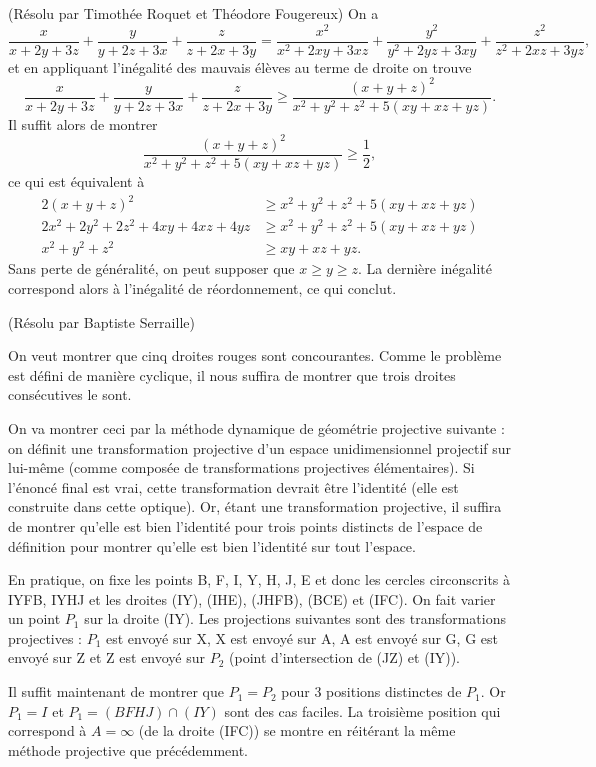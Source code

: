 \begin{sol}[83](R\'esolu par Timoth\'ee Roquet et Th\'eodore Fougereux)
On a
\[\frac{x}{x+2y+3z}+\frac{y}{y+2z+3x}+\frac{z}{z+2x+3y}=\frac{x^2}{x^2+2xy+3xz}+\frac{y^2}{y^2+2yz+3xy}+\frac{z^2}{z^2+2xz+3yz},\]
et en appliquant l'in\'egalit\'e des mauvais \'el\`eves au terme de droite on trouve
\[\frac{x}{x+2y+3z}+\frac{y}{y+2z+3x}+\frac{z}{z+2x+3y}\geq \frac{(x+y+z)^2}{x^2+y^2+z^2+5(xy+xz+yz)}.\]
Il suffit alors de montrer
\[\frac{(x+y+z)^2}{x^2+y^2+z^2+5(xy+xz+yz)}\geq \frac12,\]
ce qui est \'equivalent \`a
\begin{align*}
2(x+y+z)^2 &\geq x^2+y^2+z^2+5(xy+xz+yz)\\
2x^2+2y^2+2z^2+4xy+4xz+4yz &\geq x^2+y^2+z^2+5(xy+xz+yz)\\
x^2+y^2+z^2 &\geq xy+xz+yz.
\end{align*}
Sans perte de g\'en\'eralit\'e, on peut supposer que $x\geq y\geq z$. La derni\`ere in\'egalit\'e correspond alors \`a l'in\'egalit\'e de r\'eordonnement, ce qui conclut.

\end{sol}

\begin{sol}[97](Résolu par Baptiste Serraille)

On veut montrer que cinq droites rouges sont concourantes. Comme le problème est d\'efini de manière cyclique, il nous suffira de montrer que trois droites cons\'ecutives le sont. 

On va montrer ceci par la m\'ethode dynamique de g\'eom\'etrie projective suivante : 
on d\'efinit une transformation projective d'un espace unidimensionnel projectif sur lui-même (comme compos\'ee de transformations projectives \'el\'ementaires). Si l'\'enonc\'e final est vrai, cette transformation devrait être l'identit\'e (elle est construite dans cette optique). Or, \'etant une transformation projective, il suffira de montrer qu'elle est bien l'identit\'e pour trois points distincts de l'espace de d\'efinition pour montrer qu'elle est bien l'identit\'e sur tout l'espace. 

En pratique, on fixe les points B, F, I, Y, H, J, E et donc les cercles circonscrits à IYFB, IYHJ et les droites (IY), (IHE), (JHFB), (BCE) et (IFC). On fait varier un point $P_1$ sur la droite (IY). Les projections suivantes sont des transformations projectives : $P_1$ est envoy\'e sur X, X est envoy\'e sur A, A est envoy\'e sur G, G est envoy\'e sur Z et Z est envoy\'e sur $P_2$ (point d'intersection de (JZ) et (IY)). 

Il suffit maintenant de montrer que $P_1=P_2$ pour $3$ positions distinctes de $P_1$. Or $P_1=I$ et $P_1=(BFHJ)\cap (IY)$ sont des cas faciles. La troisième position qui correspond à $A = \infty$ (de la droite (IFC)) se montre en r\'eit\'erant la même m\'ethode projective que pr\'ec\'edemment. 
	
\end{sol}

